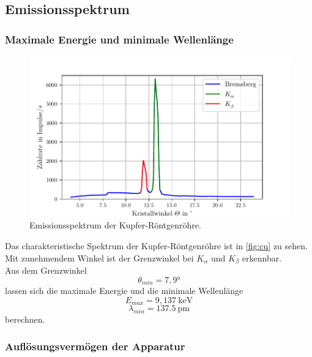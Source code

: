 \subsection{Emissionsspektrum}
\label{subsec:emissionsspektrum}


\subsubsection*{Maximale Energie und minimale Wellenlänge}

\begin{figure}
  \centering
  \includegraphics{build/plot_cu.pdf}
  \caption{Emissionsspektrum der Kupfer-Röntgenröhre.}
  \label{fig:cu}
\end{figure}


Das charakteristische Spektrum der Kupfer-Röntgenröhre ist in \autoref{fig:cu} zu sehen.\\
Mit zunehmendem Winkel ist der Grenzwinkel bei  $K_{\alpha}$ und $K_{\beta}$ erkennbar. \\ 
Aus dem Grenzwinkel 
\begin{equation*}
  \theta_{min} = 7,9°
\end{equation*}
lassen sich die maximale Energie und die minimale Wellenlänge 
\begin{equation*}
  E_{max} = 9,137\ \mathrm{keV}
\end{equation*}
\begin{equation*}
  \lambda_{min} = 137.5\ \si{\pico\m}
\end{equation*} 
berechnen.


\subsubsection*{Auflösungsvermögen der Apparatur}


